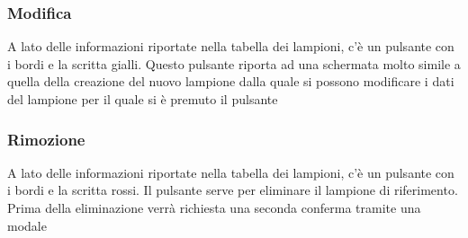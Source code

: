 \documentclass[a4paper, 12pt]{article}
\begin{document}
\subsubsection{Modifica}
A lato delle informazioni riportate nella tabella dei lampioni, c'è un pulsante con i bordi e la scritta gialli. Questo pulsante riporta ad una schermata molto simile a quella della creazione del nuovo lampione dalla quale si possono modificare i dati del lampione per il quale si è premuto il pulsante

\subsubsection{Rimozione}
A lato delle informazioni riportate nella tabella dei lampioni, c'è un pulsante con i bordi e la scritta rossi. Il pulsante serve per eliminare il lampione di riferimento. Prima della eliminazione verrà richiesta una seconda conferma tramite una modale
\end{document}
